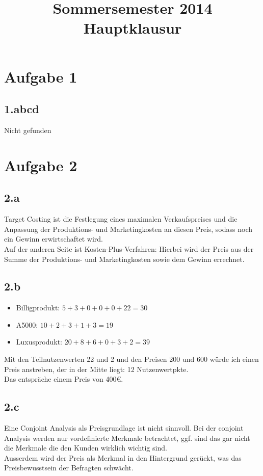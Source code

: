 

\title{Sommersemester 2014 Hauptklausur}
\maketitle


\section*{Aufgabe 1}
\subsection*{1.abcd}
    Nicht gefunden

\section*{Aufgabe 2}
\subsection*{2.a}
    Target Costing ist die Festlegung eines maximalen Verkaufspreises und die Anpassung der Produktions- und Marketingkosten an diesen Preis, sodass noch ein Gewinn erwirtschaftet wird. \\
    Auf der anderen Seite ist Kosten-Plus-Verfahren: Hierbei wird der Preis aus der Summe der Produktions- und Marketingkosten sowie dem Gewinn errechnet.

\subsection*{2.b}
    \begin{itemize}
        \item Billigprodukt: $5+3+0+0+0+22 = 30$
        \item A5000: $10+2+3+1+3 = 19$
        \item Luxusprodukt: $20+8+6+0+3+2 = 39$
    \end{itemize}

    Mit den Teilnutzenwerten 22 und 2 und den Preisen 200 und 600 würde ich einen Preis anstreben, der in der Mitte liegt: 12 Nutzenwertpkte. \\
    Das entspräche einem Preis von 400€.

\subsection*{2.c}
    Eine Conjoint Analysis als Preisgrundlage ist nicht sinnvoll. Bei der conjoint Analysis werden nur vordefinierte Merkmale betrachtet, ggf. sind das gar nicht die Merkmale die den Kunden wirklich wichtig sind. \\
    Ausserdem wird der Preis als Merkmal in den Hintergrund gerückt, was das Preisbewusstsein der Befragten schwächt.


